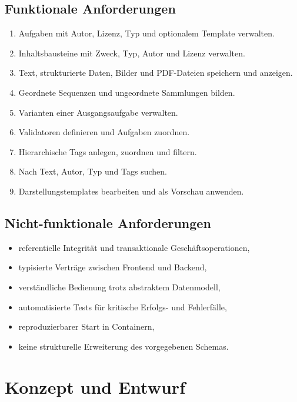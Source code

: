 \documentclass[11pt,a4paper]{article}
\begin{document}
\subsection{Funktionale Anforderungen}
\begin{enumerate}[label=F\arabic*]
\item Aufgaben mit Autor, Lizenz, Typ und optionalem Template verwalten.
\item Inhaltsbausteine mit Zweck, Typ, Autor und Lizenz verwalten.
\item Text, strukturierte Daten, Bilder und PDF-Dateien speichern und anzeigen.
\item Geordnete Sequenzen und ungeordnete Sammlungen bilden.
\item Varianten einer Ausgangsaufgabe verwalten.
\item Validatoren definieren und Aufgaben zuordnen.
\item Hierarchische Tags anlegen, zuordnen und filtern.
\item Nach Text, Autor, Typ und Tags suchen.
\item Darstellungstemplates bearbeiten und als Vorschau anwenden.
\end{enumerate}

\subsection{Nicht-funktionale Anforderungen}
\begin{itemize}
\item referentielle Integrität und transaktionale Geschäftsoperationen,
\item typisierte Verträge zwischen Frontend und Backend,
\item verständliche Bedienung trotz abstraktem Datenmodell,
\item automatisierte Tests für kritische Erfolgs- und Fehlerfälle,
\item reproduzierbarer Start in Containern,
\item keine strukturelle Erweiterung des vorgegebenen Schemas.
\end{itemize}

\section{Konzept und Entwurf}
\end{document}
